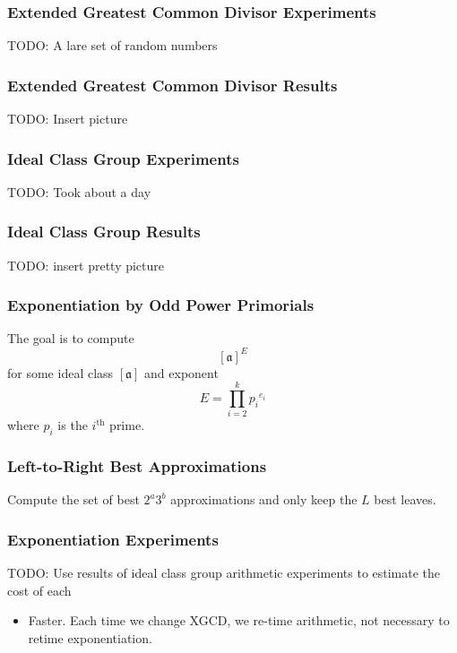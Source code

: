 \documentclass{beamer}
\newcommand{\ideal}{\mathfrak}
\newcommand{\idealclass}[1]{\left[ \ideal #1 \right]}
\newcommand{\aclass}{\idealclass a}
\newcommand{\ith}{i^{\textrm{th}}}
\begin{document}
\begin{frame}
\frametitle{Extended Greatest Common Divisor Experiments}
TODO: A lare set of random numbers
\end{frame}

\begin{frame}
\frametitle{Extended Greatest Common Divisor Results}
TODO: Insert picture
\end{frame}

\begin{frame}
\frametitle{Ideal Class Group Experiments}
TODO: Took about a day
\end{frame}

\begin{frame}
\frametitle{Ideal Class Group Results}
TODO: insert pretty picture
\end{frame}

\begin{frame}
\frametitle{Exponentiation by Odd Power Primorials}
The goal is to compute
\[
\aclass ^ E
\]
for some ideal class $\aclass$ and exponent
\[
	E = \prod_{i=2}^k {p_i}^{e_i}
\]
where $p_i$ is the $\ith$ prime.
\end{frame}

\begin{frame}
\frametitle{Left-to-Right Best Approximations}
Compute the set of best $2^a3^b$ approximations and only keep the $L$ best leaves.
\end{frame}

\begin{frame}
\frametitle{Exponentiation Experiments}
TODO: Use results of ideal class group arithmetic experiments to estimate the cost of each
\begin{itemize}
\item Faster.  Each time we change XGCD, we re-time arithmetic, not necessary to retime exponentiation.
\end{itemize}
\end{frame}
\end{document}
